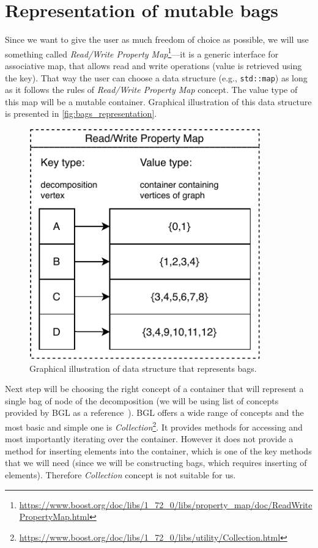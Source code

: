 \documentclass[thesis=B,english]{FITthesis}[2019/03/21]
\begin{document}
\section{Representation of mutable bags}\label{sec:bags_representation}
Since we want to give the user as much freedom of choice as possible, we will use something called \emph{Read/Write Property Map}\footnote{\url{https://www.boost.org/doc/libs/1_72_0/libs/property_map/doc/ReadWritePropertyMap.html}}---it is a generic interface for associative map, that allows read and write operations (value is retrieved using the key). That way the user can choose a data structure (e.g., \texttt{std::map}) as long as it follows the rules of \emph{Read/Write Property Map} concept. The value type of this map will be a mutable container. Graphical illustration of this data structure is presented in \autoref{fig:bags_representation}.

\begin{figure}[H]
	\centering
 	\includegraphics[width=10cm]{img/bags-representation.pdf}
 	\caption[Graphical illustration of data structure that represents bags]{Graphical illustration of data structure that represents bags.}
 	\label{fig:bags_representation}
\end{figure}

Next step will be choosing the right concept of a container that will represent a single bag of node of the decomposition (we will be using list of concepts provided by BGL as a reference~\cite{boost_concepts}). BGL offers a wide range of concepts and the most basic and simple one is \emph{Collection}\footnote{\url{https://www.boost.org/doc/libs/1_72_0/libs/utility/Collection.html}}. It provides methods for accessing and most importantly iterating over the container. However it does not provide a method for inserting elements into the container, which is one of the key methods that we will need (since we will be constructing bags, which requires inserting of elements). Therefore \emph{Collection} concept is not suitable for us.
\end{document}
